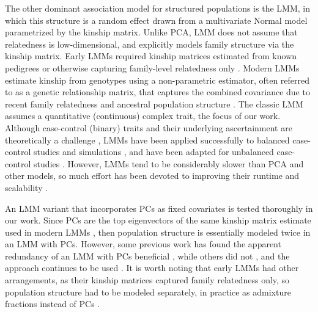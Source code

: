 \documentclass[11pt]{article}
\begin{document}
The other dominant association model for structured populations is the LMM, in which this structure is a random effect drawn from a multivariate Normal model parametrized by the kinship matrix.
Unlike PCA, LMM does not assume that relatedness is low-dimensional, and explicitly models family structure via the kinship matrix.
Early LMMs required kinship matrices estimated from known pedigrees or otherwise capturing family-level relatedness only \citep{yu_unified_2006, zhao_arabidopsis_2007}.
Modern LMMs estimate kinship from genotypes using a non-parametric estimator, often referred to as a genetic relationship matrix, that captures the combined covariance due to recent family relatedness and ancestral population structure \citep{kang_efficient_2008, astle_population_2009}.
The classic LMM assumes a quantitative (continuous) complex trait, the focus of our work.
Although case-control (binary) traits and their underlying ascertainment are theoretically a challenge \citep{yang_advantages_2014}, LMMs have been applied successfully to balanced case-control studies \citep{astle_population_2009, kang_variance_2010} and simulations \citep{price_new_2010, wu_comparison_2011, sul_mixed_2013}, and have been adapted for unbalanced case-control studies \citep{zhou_efficiently_2018}.
However, LMMs tend to be considerably slower than PCA and other models, so much effort has been devoted to improving their runtime and scalability \citep{aulchenko_genomewide_2007, kang_efficient_2008, kang_variance_2010, zhang_mixed_2010, lippert_fast_2011, yang_gcta:_2011, listgarten_improved_2012, zhou_genome-wide_2012, svishcheva_rapid_2012, loh_efficient_2015, zhou_efficiently_2018}.

An LMM variant that incorporates PCs as fixed covariates is tested thoroughly in our work.
Since PCs are the top eigenvectors of the same kinship matrix estimate used in modern LMMs \citep{astle_population_2009, hoffman_correcting_2013}, then population structure is essentially modeled twice in an LMM with PCs.
However, some previous work has found the apparent redundancy of an LMM with PCs beneficial \citep{price_new_2010, tucker_improving_2014}, while others did not \citep{liu_controlling_2011}, and the approach continues to be used \citep{zeng_signatures_2018}.
It is worth noting that early LMMs had other arrangements, as their kinship matrices captured family relatedness only, so population structure had to be modeled separately, in practice as admixture fractions instead of PCs \citep{yu_unified_2006, zhao_arabidopsis_2007}.
\end{document}
